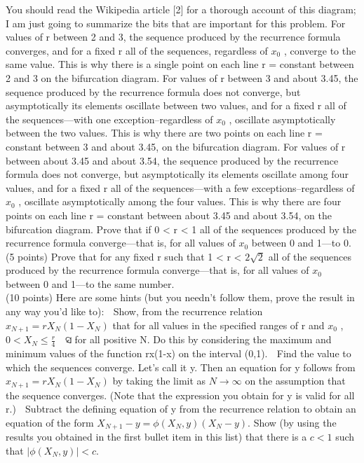 You should read the Wikipedia article [2] for a thorough account of this diagram; I am just going to
summarize the bits that are important for this problem. For values of r between 2 and 3, the
sequence produced by the recurrence formula converges, and for a fixed r all of the sequences,
regardless of $x_0$
 , converge to the same value. This is why there is a single point on each line r = constant between 2 and 3 on the bifurcation diagram. For values of r between 3 and about 3.45,
the sequence produced by the recurrence formula does not converge, but asymptotically its
elements oscillate between two values, and for a fixed r all of the sequences—with one
exception--regardless of $x_0$
 , oscillate asymptotically between the two values. This is why there
are two points on each line r = constant between 3 and about 3.45, on the bifurcation diagram.
For values of r between about 3.45 and about 3.54, the sequence produced by the recurrence
formula does not converge, but asymptotically its elements oscillate among four values, and for a
fixed r all of the sequences—with a few exceptions--regardless of $x_0$
 , oscillate asymptotically
among the four values. This is why there are four points on each line r = constant between about
3.45 and about 3.54, on the bifurcation diagram.
Prove that if 0 < r < 1 all of the sequences produced by the recurrence formula converge—that
is, for all values of $x_0$
 between 0 and 1---to 0. (5 points)
Prove that for any fixed r such that 1 < r < $2 \sqrt{2}$ all of the sequences produced by the
recurrence formula converge—that is, for all values of $x_0$
 between 0 and 1---to the same number. \\ 
 (10 points) Here are some hints (but you needn’t follow them, prove the result in any way you’d
like to):
 Show, from the recurrence relation $x_{N+1}=rX_N (1-X_N)$ that for all values in the specified
ranges of r and $x_0$
 , $0<X_N \leq \frac{r}{4}$
௥
ସ
 for all positive N. Do this by considering the maximum
and minimum values of the function rx(1-x) on the interval (0,1).
 Find the value to which the sequences converge. Let’s call it y. Then an equation for y
follows from $x_{N+1}=rX_N(1-X_N)$ by taking the limit as $N \rightarrow \infty$ on the assumption that the
sequence converges. (Note that the expression you obtain for y is valid for all r.)
 Subtract the defining equation of y from the recurrence relation to obtain an equation of
the form $X_{N+1}-y=\phi (X_N, y)(X_N-y).$ Show (by using the results you obtained in the first bullet item in this list) that there is a
$c < 1$ such that $|\phi (X_N,y)|<c.$\\ 
